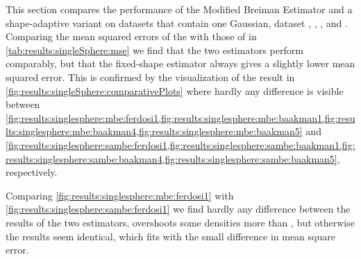
\begin{figure*}
	\centering
	
	\caption{Plot of the estimated density as a function of the known density of the datasets with a single Gaussian by (-) \mbe and (-) \sambe.}
	\label{fig:results:singleSphere:comparativePlots}
\end{figure*}

\begin{table}
	\centering
	
	\caption{Performance of the Modified Breiman Estimator with fixed-shaped and shape-adaptive kernels on the datasets with a single Gaussian.} 	
	\label{tab:results:singleSphere:mse}
\end{table}

This section compares the performance of the Modified Breiman Estimator and a shape-adaptive variant on datasets that contain one Gaussian, \ie dataset \ferdosiOne, \baakmanOne, \baakmanFour, and \baakmanFive. Comparing the mean squared errors of the \mbe with those of \sambe in \cref{tab:results:singleSphere:mse} we find that the two estimators perform comparably, but that the fixed-shape estimator always gives a slightly lower mean squared error. This is confirmed by the visualization of the result in \cref{fig:results:singleSphere:comparativePlots} where hardly any difference is visible between \cref{fig:results:singlesphere:mbe:ferdosi1,fig:results:singlesphere:mbe:baakman1,fig:results:singlesphere:mbe:baakman4,fig:results:singlesphere:mbe:baakman5} and \cref{fig:results:singlesphere:sambe:ferdosi1,fig:results:singlesphere:sambe:baakman1,fig:results:singlesphere:sambe:baakman4,fig:results:singlesphere:sambe:baakman5}, respectively.

		Comparing \cref{fig:results:singlesphere:mbe:ferdosi1} with \cref{fig:results:singlesphere:sambe:ferdosi1} we find hardly any difference between the results of the two estimators, \sambe overshoots some densities more than \mbe, but otherwise the results seem identical, which fits with the small difference in mean square error.




